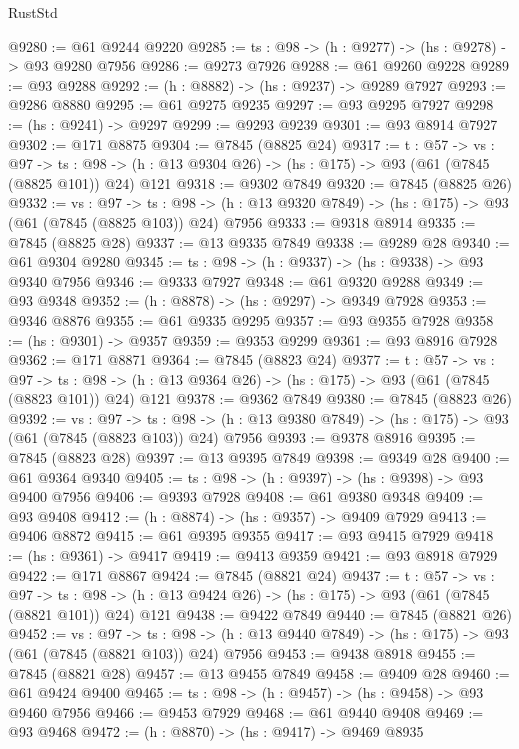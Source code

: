 \begin{lexlean}{RustStd}
\begin{coremodule}
@9280 := @61 @9244 @9220
@9285 := {ts : @98} -> (h : @9277) -> (hs : @9278) -> @93 @9280 @7956
@9286 := @9273 @7926
@9288 := @61 @9260 @9228
@9289 := @93 @9288
@9292 := (h : @8882) -> (hs : @9237) -> @9289 @7927
@9293 := @9286 @8880
@9295 := @61 @9275 @9235
@9297 := @93 @9295 @7927
@9298 := (hs : @9241) -> @9297
@9299 := @9293 @9239
@9301 := @93 @8914 @7927
@9302 := @171 @8875
@9304 := @7845 (@8825 @24)
@9317 := {t : @57} ->
  {vs : @97} ->
  {ts : @98} -> (h : @13 @9304 @26) -> (hs : @175) -> @93 (@61 (@7845 (@8825 @101)) @24) @121
@9318 := @9302 @7849
@9320 := @7845 (@8825 @26)
@9332 := {vs : @97} ->
  {ts : @98} -> (h : @13 @9320 @7849) -> (hs : @175) -> @93 (@61 (@7845 (@8825 @103)) @24) @7956
@9333 := @9318 @8914
@9335 := @7845 (@8825 @28)
@9337 := @13 @9335 @7849
@9338 := @9289 @28
@9340 := @61 @9304 @9280
@9345 := {ts : @98} -> (h : @9337) -> (hs : @9338) -> @93 @9340 @7956
@9346 := @9333 @7927
@9348 := @61 @9320 @9288
@9349 := @93 @9348
@9352 := (h : @8878) -> (hs : @9297) -> @9349 @7928
@9353 := @9346 @8876
@9355 := @61 @9335 @9295
@9357 := @93 @9355 @7928
@9358 := (hs : @9301) -> @9357
@9359 := @9353 @9299
@9361 := @93 @8916 @7928
@9362 := @171 @8871
@9364 := @7845 (@8823 @24)
@9377 := {t : @57} ->
  {vs : @97} ->
  {ts : @98} -> (h : @13 @9364 @26) -> (hs : @175) -> @93 (@61 (@7845 (@8823 @101)) @24) @121
@9378 := @9362 @7849
@9380 := @7845 (@8823 @26)
@9392 := {vs : @97} ->
  {ts : @98} -> (h : @13 @9380 @7849) -> (hs : @175) -> @93 (@61 (@7845 (@8823 @103)) @24) @7956
@9393 := @9378 @8916
@9395 := @7845 (@8823 @28)
@9397 := @13 @9395 @7849
@9398 := @9349 @28
@9400 := @61 @9364 @9340
@9405 := {ts : @98} -> (h : @9397) -> (hs : @9398) -> @93 @9400 @7956
@9406 := @9393 @7928
@9408 := @61 @9380 @9348
@9409 := @93 @9408
@9412 := (h : @8874) -> (hs : @9357) -> @9409 @7929
@9413 := @9406 @8872
@9415 := @61 @9395 @9355
@9417 := @93 @9415 @7929
@9418 := (hs : @9361) -> @9417
@9419 := @9413 @9359
@9421 := @93 @8918 @7929
@9422 := @171 @8867
@9424 := @7845 (@8821 @24)
@9437 := {t : @57} ->
  {vs : @97} ->
  {ts : @98} -> (h : @13 @9424 @26) -> (hs : @175) -> @93 (@61 (@7845 (@8821 @101)) @24) @121
@9438 := @9422 @7849
@9440 := @7845 (@8821 @26)
@9452 := {vs : @97} ->
  {ts : @98} -> (h : @13 @9440 @7849) -> (hs : @175) -> @93 (@61 (@7845 (@8821 @103)) @24) @7956
@9453 := @9438 @8918
@9455 := @7845 (@8821 @28)
@9457 := @13 @9455 @7849
@9458 := @9409 @28
@9460 := @61 @9424 @9400
@9465 := {ts : @98} -> (h : @9457) -> (hs : @9458) -> @93 @9460 @7956
@9466 := @9453 @7929
@9468 := @61 @9440 @9408
@9469 := @93 @9468
@9472 := (h : @8870) -> (hs : @9417) -> @9469 @8935

\end{coremodule}
\end{lexlean}
